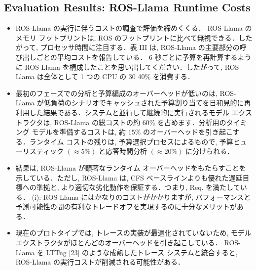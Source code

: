 \subsection{Evaluation Results: ROS-Llama Runtime Costs}
\label{ssec: evaluation results: ros-llama runtime costs}

\begin{frame}{}
    \begin{itemize}
        \item ROS-Llama の実行に伴うコストの調査で評価を締めくくる． ROS-Llama のメモリ フットプリントは, ROS のフットプリントに比べて無視できる．したがって, プロセッサ時間に注目する．表 III は, ROS-Llama の主要部分の呼び出しごとの平均コストを報告している． 6 秒ごとに予算を再計算するように ROS-Llama を構成したことを思い出してください．したがって, ROS-Llama は全体として 1 つの CPU の 30 $40 \%$ を消費する．
    \end{itemize}
\end{frame}

\begin{frame}{}
    \begin{itemize}
        \item 最初のフェーズでの分析と予算編成のオーバーヘッドが低いのは, ROS-Llama が低負荷のシナリオでキャッシュされた予算割り当てを日和見的に再利用した結果である．システムと並行して継続的に実行されるモデル エクストラクタは, ROS-Llama の総コストの約 $60 \%$ を占めます．分析用のタイミング モデルを準備するコストは, 約 $15 \%$ のオーバーヘッドを引き起こする．ランタイム コストの残りは, 予算選択プロセスによるもので, 予算ヒューリスティック $(\approx 5 \%)$ と応答時間分析 $(\approx 20 \%)$ に分けられる．
    \end{itemize}
\end{frame}

\begin{frame}{}
    \begin{itemize}
        \item 結果は, ROS-Llama が顕著なランタイム オーバーヘッドをもたらすことを示している．ただし, ROS-Llama は, CFS ベースラインよりも優れた遅延目標への準拠と, より適切な劣化動作を保証する．つまり, Req. を満たしている． (i): ROS-Llama にはかなりのコストがかかりますが, パフォーマンスと予測可能性の間の有利なトレードオフを実現するのに十分なメリットがある．
    \end{itemize}
\end{frame}

\begin{frame}{}
    \begin{itemize}
        \item 現在のプロトタイプでは, トレースの実装が最適化されていないため, モデル エクストラクタがほとんどのオーバーヘッドを引き起こしている． ROS-Llama を LTTng [23] のような成熟したトレース システムと統合すると, ROS-Llama の実行コストが削減される可能性がある．
    \end{itemize}
\end{frame}
